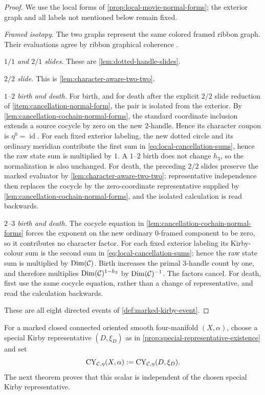 \begin{proof}
We use the local forms of \cref{prop:local-movie-normal-forms}; the exterior
graph and all labels not mentioned below remain fixed.

\emph{Framed isotopy.}
The two graphs represent the same colored framed ribbon graph.  Their
evaluations agree by ribbon graphical coherence
\cite[Theorem~6.1]{Shum1994}.

\emph{$1/1$ and $2/1$ slides.}
These are \cref{lem:dotted-handle-slides}.

\emph{$2/2$ slide.}
This is \cref{lem:character-aware-two-two}.

\emph{$1$--$2$ birth and death.}
For birth, and for death after the explicit $2/2$ slide reduction of
\cref{item:cancellation-normal-form}, the pair is isolated from the exterior.
By \cref{lem:cancellation-cochain-normal-forms}, the standard coordinate
inclusion extends a source cocycle by zero on the new $2$-handle.  Hence its
character coupon is
$\eta^0=\operatorname{id}$.  For each fixed exterior labeling, the new
dotted circle and its ordinary meridian contribute the first sum in
\eqref{eq:local-cancellation-sums}, hence the raw state sum is multiplied by
$1$.  A $1$--$2$ birth does not change $h_3$, so the normalization is also
unchanged.  For death, the preceding $2/2$ slides preserve the marked
evaluator by \cref{lem:character-aware-two-two}; representative independence
then replaces the cocycle by the zero-coordinate representative supplied by
\cref{lem:cancellation-cochain-normal-forms}, and the isolated calculation
is read backwards.

\emph{$2$--$3$ birth and death.}
The cocycle equation in \cref{lem:cancellation-cochain-normal-forms} forces
the exponent on the new ordinary $0$-framed component to be zero, so it
contributes no character factor.  For each fixed exterior labeling its
Kirby-colour sum is the second sum in
\eqref{eq:local-cancellation-sums}; hence the raw state sum is multiplied by
$\operatorname{Dim}(\mathcal{C})$.  Birth increases the primal $3$-handle count by
one, and therefore multiplies
$\operatorname{Dim}(\mathcal{C})^{1-h_3}$ by
$\operatorname{Dim}(\mathcal{C})^{-1}$.  The factors cancel.  For death, first use
the same cocycle equation, rather than a change of representative, and read
the calculation backwards.

These are all eight directed events of
\cref{def:marked-kirby-event}.
\end{proof}

\begin{definition}
\label{def:manifold-level-evaluator}
For a marked closed connected oriented smooth four-manifold $(X,\alpha)$, choose a
special Kirby representative $(D,\xi_D)$ as in
\cref{prop:special-representative-existence} and set
\[
  \operatorname{CY}_{\mathcal{C},\eta}(X,\alpha)
  :=\operatorname{CY}_{\mathcal{C},\eta}(D,\xi_D).
\]
The next theorem proves that this scalar is independent of the chosen
special Kirby representative.
\end{definition}

